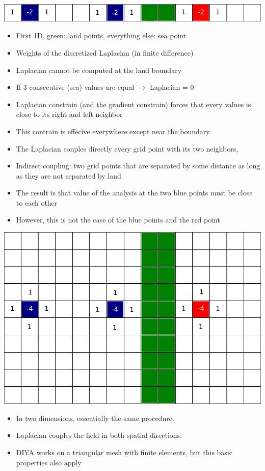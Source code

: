 \documentclass[16pt]{article}
\begin{document}
\centerline{\includegraphics[width=.7\linewidth]{land_sea_decoupling1D}}


\begin{itemize}
\item First 1D, green: land points, everything else: sea point
\item Weights of the discretized Laplacian (in finite difference)
\item Laplacian cannot be computed at the land boundary
\item If 3 consecutive (sea) values are equal $\rightarrow$ Laplacian = 0
\item Laplacian constrain (and the gradient constrain) forces that every values is close to its right and left neighbor
\item This contrain is effecive everywhere except near the boundary
\item The Laplacian couples directly every grid point with its two neighbors,
\item Indirect coupling: two grid points that are separated by some distance as long as they are not separated by land
\item The result is that value of the analysis at the two blue points must be close to each other
\item However, this is not the case of the blue points and the red point
\end{itemize}


\centerline{\includegraphics[width=.7\linewidth]{land_sea_decoupling}}

\begin{itemize}
\item In two dimensions, essentially the same procedure.
\item Laplacian couples the field in both spatial directions.
\item DIVA works on a triangular mesh with finite elements, but this basic properties also apply
\end{itemize}
\end{document}
